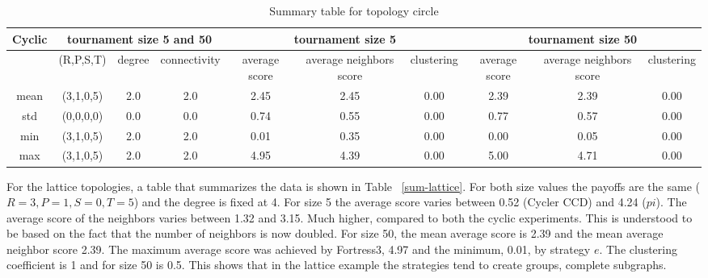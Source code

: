 \begin{table}[!hbtp]
	\centering
	\begin{adjustbox}{width=1\textwidth}
		\small
		\begin{tabular}{cccccccccc}
				\toprule
			Cyclic & \multicolumn{3}{|c|}{tournament size 5 and 50} & \multicolumn{3}{c|}{tournament size 5} & \multicolumn{3}{c}{tournament size 50}                             \\\midrule

			     & (R,P,S,T) & degree & connectivity & average score & average neighbors score & clustering & average score & average neighbors score & clustering \\\midrule
			mean & (3,1,0,5) & 2.0    & 2.0          & 2.45          & 2.45                    & 0.00       & 2.39          & 2.39                    & 0.00       \\\midrule
			std  & (0,0,0,0) & 0.0    & 0.0          & 0.74          & 0.55                    & 0.00       & 0.77          & 0.57                    & 0.00       \\\midrule
			min  & (3,1,0,5) & 2.0    & 2.0          & 0.01          & 0.35                    & 0.00       & 0.00          & 0.05                    & 0.00       \\\midrule
			max  & (3,1,0,5) & 2.0    & 2.0          & 4.95          & 4.39                    & 0.00       & 5.00          & 4.71                    & 0.00       \\ \bottomrule
		\end{tabular}
	\end{adjustbox}
	\caption{Summary table for topology circle}
	\label{sum-cicle}
\end{table}

For the lattice topologies, a table that summarizes the data is shown in Table
~\ref{sum-lattice}. For both size values the payoffs are the same (\(R=3, P=1,
S=0, T=5\)) and the degree is fixed at 4. For size 5 the average score
varies between 0.52 (Cycler CCD) and 4.24 ($pi$). The average score of the neighbors
varies between 1.32 and 3.15. Much higher, compared to both the cyclic experiments.
This is understood to be based on the fact that the number of neighbors is now
doubled. For size 50, the mean average score is 2.39 and the mean average neighbor
score 2.39. The maximum average score was achieved by Fortress3, 4.97 and the
minimum, 0.01, by strategy $e$. The clustering coefficient is 1 and for size
50 is 0.5. This shows that in the lattice example the strategies tend to create
groups, complete subgraphs.


